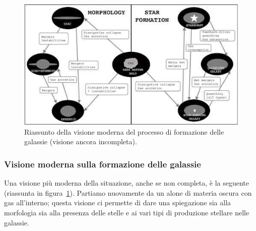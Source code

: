 \begin{figure}
    \centering
    \includegraphics[width = \textwidth]{immagini/formazione-delle-galassie-visione-moderna.jpg}
    \caption{Riassunto della visione moderna del processo di formazione delle galassie (visione ancora incompleta).}
    \label{fig:formazione-delle-galassie-visione-moderna}
\end{figure}

\subsubsection{Visione moderna sulla formazione delle galassie}
Una visione più moderna della situazione, anche se non completa, è la seguente (riassunta in figura~\ref{fig:formazione-delle-galassie-visione-moderna}). Partiamo nuovamente da un alone di materia oscura con gas all’interno; questa visione ci permette di dare una spiegazione sia alla morfologia sia alla presenza delle stelle e ai vari tipi di produzione stellare nelle galassie.

